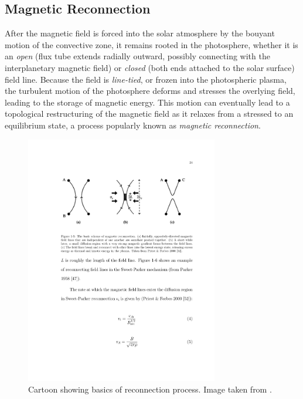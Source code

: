 \subsection{Magnetic Reconnection}
\label{subsec:magnetic_reconnection}
\par After the magnetic field is forced into the solar atmosphere by the bouyant motion of the convective zone, it remains rooted in the photosphere, whether it is an \textit{open} (flux tube extends radially outward, possibly connecting with the interplanetary magnetic field) or \textit{closed} (both ends attached to the solar surface) field line. Because the field is \textit{line-tied}, or frozen into the photospheric plasma, the turbulent motion of the photosphere deforms and stresses the overlying field, leading to the storage of magnetic energy. This motion can eventually lead to a topological restructuring of the magnetic field as it relaxes from a stressed to an equilibrium state, a process popularly known as \textit{magnetic reconnection}.
%
\begin{figure}[htbp]
	\centering
	\includegraphics[width=0.75\textwidth]{figures/reconnection_cartoon.pdf}
	\caption{Cartoon showing basics of reconnection process. Image taken from \citet{priest_magnetic_2000}.}
	\label{fig:reconnection}
\end{figure}
%
